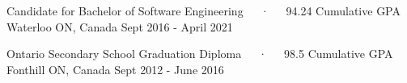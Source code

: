 
\begin{cventries}

  \vspace{0.5mm}

   {Candidate for Bachelor of Software
    Engineering~~~·~~~94.24 Cumulative GPA} {Waterloo ON, Canada} {Sept 2016 -
    April 2021}

   {Ontario Secondary School
    Graduation Diploma~~~·~~~98.5 Cumulative GPA} {Fonthill ON, Canada} {Sept
    2012 - June 2016}

\end{cventries}
